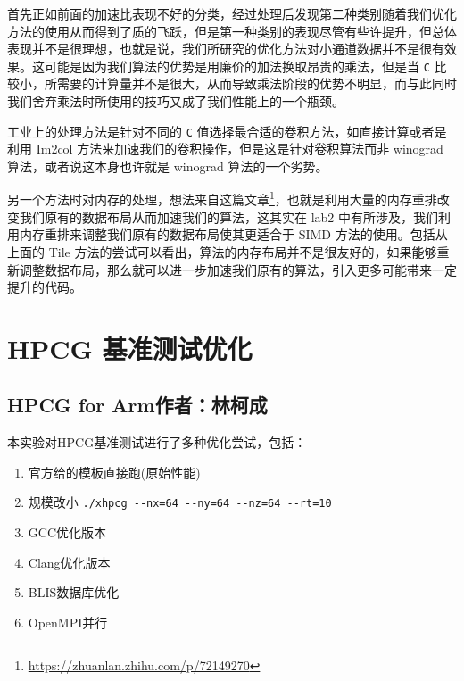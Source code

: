 \documentclass[a4paper,12pt,scheme=plain]{ctexart}
\newcommand{\inlinecode}[1]{\colorbox{gray!10}{\lstinline|#1|}}
\numberwithin{equation}{section} %
\begin{document}
首先正如前面的加速比表现不好的分类，经过处理后发现第二种类别随着我们优化方法的使用从而得到了质的飞跃，但是第一种类别的表现尽管有些许提升，但总体表现并不是很理想，也就是说，我们所研究的优化方法对小通道数据并不是很有效果。这可能是因为我们算法的优势是用廉价的加法换取昂贵的乘法，但是当 \inlinecode{C} 比较小，所需要的计算量并不是很大，从而导致乘法阶段的优势不明显，而与此同时我们舍弃乘法时所使用的技巧又成了我们性能上的一个瓶颈。

工业上的处理方法是针对不同的 \inlinecode{C} 值选择最合适的卷积方法，如直接计算或者是利用 Im2col 方法来加速我们的卷积操作，但是这是针对卷积算法而非 winograd 算法，或者说这本身也许就是 winograd 算法的一个劣势。

另一个方法时对内存的处理，想法来自这篇文章\footnote{\url{https://zhuanlan.zhihu.com/p/72149270}}，也就是利用大量的内存重排改变我们原有的数据布局从而加速我们的算法，这其实在 lab2 中有所涉及，我们利用内存重排来调整我们原有的数据布局使其更适合于 SIMD 方法的使用。包括从上面的 Tile 方法的尝试可以看出，算法的内存布局并不是很友好的，如果能够重新调整数据布局，那么就可以进一步加速我们原有的算法，引入更多可能带来一定提升的代码。

\section{HPCG 基准测试优化}

\subsection[HPCG for Arm]{HPCG for Arm\hfill\textnormal{\small \color{gray}作者：林柯成}}

本实验对HPCG基准测试进行了多种优化尝试，包括：

\begin{enumerate}
\item 官方给的模板直接跑(原始性能)
\item 规模改小 \inlinecode{./xhpcg --nx=64 --ny=64 --nz=64 --rt=10}
\item GCC优化版本
\item Clang优化版本
\item BLIS数据库优化
\item OpenMPI并行
\end{enumerate}
\end{document}

